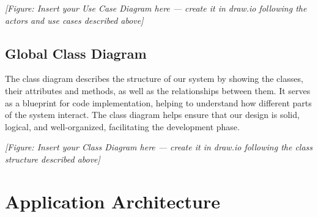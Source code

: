 \textit{[Figure: Insert your Use Case Diagram here — create it in draw.io following the actors and use cases described above]}

\subsection{Global Class Diagram}

The class diagram describes the structure of our system by showing the classes, their attributes and methods, as well as the relationships between them. It serves as a blueprint for code implementation, helping to understand how different parts of the system interact. The class diagram helps ensure that our design is solid, logical, and well-organized, facilitating the development phase.

%
%
%
%
%
%

\textit{[Figure: Insert your Class Diagram here — create it in draw.io following the class structure described above]}

\section{Application Architecture}

